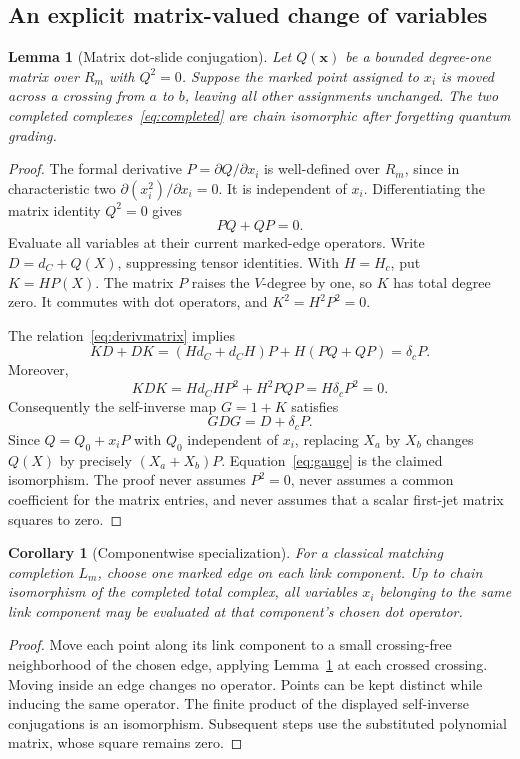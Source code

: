 \documentclass[11pt]{article}
\newtheorem{lemma}[theorem]{Lemma}
\newtheorem{corollary}[theorem]{Corollary}
\theoremstyle{definition}\newtheorem{definition}[theorem]{Definition}\newtheorem{example}[theorem]{Example}
\theoremstyle{remark}\newtheorem{remark}[theorem]{Remark}
\begin{document}
\subsection{An explicit matrix-valued change of variables}
\begin{lemma}[Matrix dot-slide conjugation]\label{lem:gauge}
Let $Q(\boldsymbol x)$ be a bounded degree-one matrix over $R_m$ with $Q^2=0$. Suppose the marked point assigned to $x_i$ is moved across a crossing from $a$ to $b$, leaving all other assignments unchanged. The two completed complexes~\eqref{eq:completed} are chain isomorphic after forgetting quantum grading.
\end{lemma}
\begin{proof}
The formal derivative $P=\partial Q/\partial x_i$ is well-defined over $R_m$, since in characteristic two $\partial(x_i^2)/\partial x_i=0$. It is independent of $x_i$. Differentiating the matrix identity $Q^2=0$ gives
\begin{equation}\label{eq:derivmatrix}
 PQ+QP=0.
\end{equation}
Evaluate all variables at their current marked-edge operators. Write $D=d_C+Q(X)$, suppressing tensor identities. With $H=H_c$, put $K=HP(X)$. The matrix $P$ raises the $V$-degree by one, so $K$ has total degree zero. It commutes with dot operators, and $K^2=H^2P^2=0$.

The relation~\eqref{eq:derivmatrix} implies
\[
 KD+DK=(Hd_C+d_CH)P+H(PQ+QP)=\delta_cP.
\]
Moreover,
\[
 KDK=Hd_CHP^2+H^2PQP=H\delta_cP^2=0.
\]
Consequently the self-inverse map $G=1+K$ satisfies
\begin{equation}\label{eq:gauge}
 GDG=D+\delta_cP.
\end{equation}
Since $Q=Q_0+x_iP$ with $Q_0$ independent of $x_i$, replacing $X_a$ by $X_b$ changes $Q(X)$ by precisely $(X_a+X_b)P$. Equation~\eqref{eq:gauge} is the claimed isomorphism. The proof never assumes $P^2=0$, never assumes a common coefficient for the matrix entries, and never assumes that a scalar first-jet matrix squares to zero.
\end{proof}

\begin{corollary}[Componentwise specialization]\label{cor:componentcollapse}
For a classical matching completion $L_m$, choose one marked edge on each link component. Up to chain isomorphism of the completed total complex, all variables $x_i$ belonging to the same link component may be evaluated at that component's chosen dot operator.
\end{corollary}
\begin{proof}
Move each point along its link component to a small crossing-free neighborhood of the chosen edge, applying Lemma~\ref{lem:gauge} at each crossed crossing. Moving inside an edge changes no operator. Points can be kept distinct while inducing the same operator. The finite product of the displayed self-inverse conjugations is an isomorphism. Subsequent steps use the substituted polynomial matrix, whose square remains zero.
\end{proof}
\end{document}

